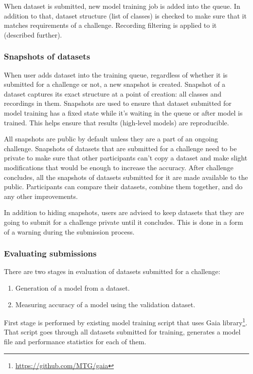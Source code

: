 When dataset is submitted, new model training job is added into the queue. In addition to that, dataset structure (list of classes) is checked to make sure that it matches requirements of a challenge. Recording filtering is applied to it (described further).

\subsubsection{Snapshots of datasets}

When user adds dataset into the training queue, regardless of whether it is submitted for a challenge or not, a new snapshot is created. Snapshot of a dataset captures its exact structure at a point of creation: all classes and recordings in them. Snapshots are used to ensure that dataset submitted for model training has a fixed state while it's waiting in the queue or after model is trained. This helps ensure that results (high-level models) are reproducible.

All snapshots are public by default unless they are a part of an ongoing challenge. Snapshots of datasets that are submitted for a challenge need to be private to make sure that other participants can't copy a dataset and make slight modifications that would be enough to increase the accuracy. After challenge concludes, all the snapshots of datasets submitted for it are made available to the public. Participants can compare their datasets, combine them together, and do any other improvements.

In addition to hiding snapshots, users are advised to keep datasets that they are going to submit for a challenge private until it concludes. This is done in a form of a warning during the submission process.

\subsubsection{Evaluating submissions}

There are two stages in evaluation of datasets submitted for a challenge:
\begin{enumerate}
    \item Generation of a model from a dataset.
    \item Measuring accuracy of a model using the validation dataset.
\end{enumerate}

First stage is performed by existing model training script that uses Gaia library\footnote{\url{https://github.com/MTG/gaia}}. That script goes through all datasets submitted for training, generates a model file and performance statistics for each of them.

